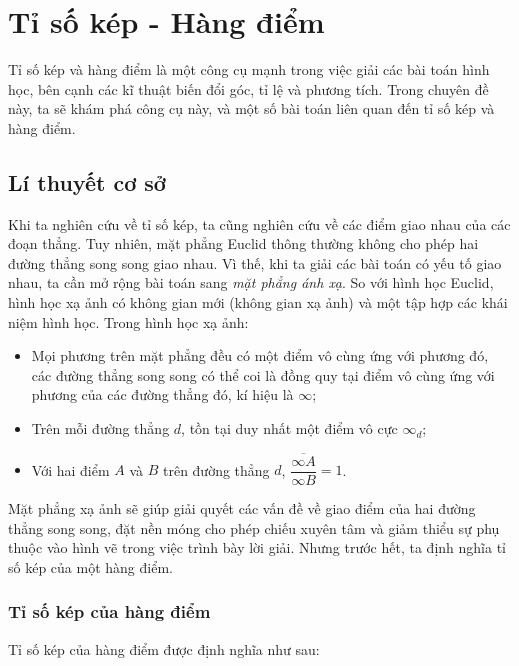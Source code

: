 \chapter{Tỉ số kép - Hàng điểm}
\label{ch:tisokep-hangdiem}

Tỉ số kép và hàng điểm là một công cụ mạnh trong việc giải các bài toán hình học, bên cạnh các kĩ thuật biến đổi góc, tỉ lệ và phương tích. Trong chuyên đề này, ta sẽ khám phá công cụ này, và một số bài toán liên quan đến tỉ số kép và hàng điểm.

\section{Lí thuyết cơ sở}

    Khi ta nghiên cứu về tỉ số kép, ta cũng nghiên cứu về các điểm giao nhau của các đoạn thẳng. Tuy nhiên, mặt phẳng Euclid thông thường không cho phép hai đường thẳng song song giao nhau. Vì thế, khi ta giải các bài toán có yếu tố giao nhau, ta cần mở rộng bài toán sang \emph{mặt phẳng ánh xạ}. So với hình học Euclid, hình học xạ ảnh có không gian mới (không gian xạ ảnh) và một tập hợp các khái niệm hình học. Trong hình học xạ ảnh:
            
    \begin{itemize}
        \item Mọi phương trên mặt phẳng đều có một điểm vô cùng ứng với phương đó, các đường thẳng song song có thể coi là đồng quy tại điểm vô cùng ứng với phương của các đường thẳng đó, kí hiệu là \(\infty\);
        \item Trên mỗi đường thẳng \(d\), tồn tại duy nhất một điểm vô cực \(\infty_d\);
        \item Với hai điểm \(A\) và \(B\) trên đường thẳng \(d\), \(\dfrac{\overline{\infty A}}{\infty B} = 1\).
    \end{itemize}

    Mặt phẳng xạ ảnh sẽ giúp giải quyết các vấn đề về giao điểm của hai đường thẳng song song, đặt nền móng cho phép chiếu xuyên tâm và giảm thiểu sự phụ thuộc vào hình vẽ trong việc trình bày lời giải. Nhưng trước hết, ta định nghĩa tỉ số kép của một hàng điểm.

    \newpage

    \subsection{Tỉ số kép của hàng điểm}

        Tỉ số kép của hàng điểm được định nghĩa như sau:

